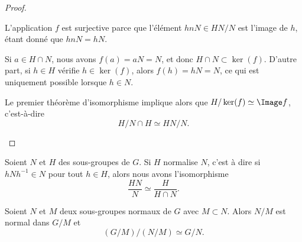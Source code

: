 \begin{proof}
\begin{enumerate}
		      \begin{subproof}
			      L'application \( f\) est surjective parce que l'élément \( hnN\in HN/N\) est l'image de \( h\), étant donné que \( hnN=hN\).

			      \spitem[\( \ker(f) = H\cap N\)]
			      Si \( a\in H\cap N\), nous avons \( f(a) =aN = N\), et donc \( H\cap N\subset \ker(f)\). D'autre part, si \( h\in H\) vérifie \( h\in\ker(f)\), alors \( f(h)=hN=N\), ce qui est uniquement possible lorsque \( h\in N\).

		      \end{subproof}
		      Le premier théorème d'isomorphisme implique alors que \( H/\ker(f)\simeq \Image f\), c'est-à-dire
		      \begin{equation}
			      H/N\cap H\simeq HN/N.
		      \end{equation}
	\end{enumerate}
\end{proof}

\begin{proposition}     \label{PROPooVBGMooPTlyLF}
	Soient \( N\) et \( H\) des sous-groupes de \( G\). Si \( H\) normalise \( N\), c'est à dire si \( hNh^{-1}\in N\) pour tout \( h\in H\), alors nous avons l'isomorphisme
	\begin{equation}
		\frac{ HN }{ N }\simeq\frac{ H }{ H\cap N }.
	\end{equation}
\end{proposition}

\begin{theorem}  \label{ThoezgBep}
	Soient \( N\) et \( M\) deux sous-groupes normaux de \( G\) avec \( M\subset N\). Alors \( N/M\) est normal dans \( G/M\) et
	\begin{equation}
		(G/M)/(N/M)\simeq G/N.
	\end{equation}
\end{theorem}

